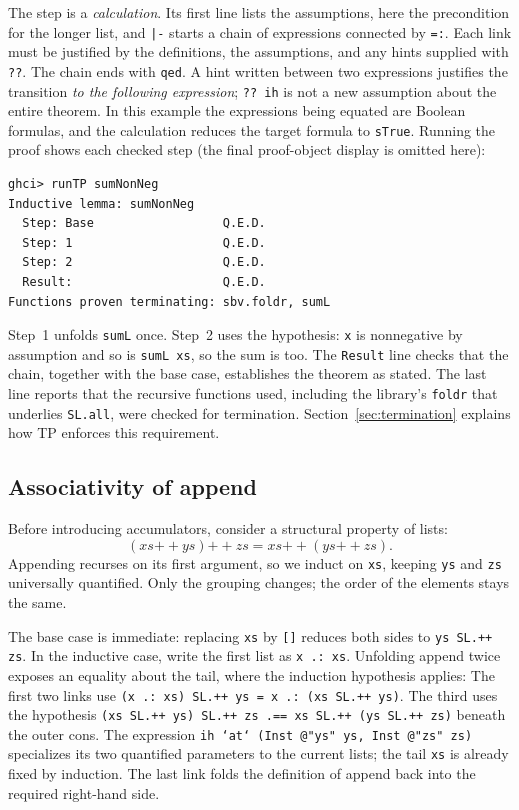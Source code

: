 \documentclass[review]{jfp-epi}
\newcommand{\code}[1]{\texttt{#1}}
\begin{document}
The step is a \emph{calculation}. Its first line lists the assumptions, here the
precondition for the longer list, and \code{|-} starts a chain of expressions
connected by \code{=:}. Each link must be justified by the definitions, the
assumptions, and any hints supplied with \code{??}. The chain ends with
\code{qed}. A hint written between two expressions justifies the transition
\emph{to the following expression}; \code{?? ih} is not a new assumption about
the entire theorem. In this example the expressions being equated are Boolean
formulas, and the calculation reduces the target formula to \code{sTrue}.
Running the proof shows each checked step (the final proof-object display is
omitted here):
\begin{lstlisting}[style=output]
ghci> runTP sumNonNeg
Inductive lemma: sumNonNeg
  Step: Base                  Q.E.D.
  Step: 1                     Q.E.D.
  Step: 2                     Q.E.D.
  Result:                     Q.E.D.
Functions proven terminating: sbv.foldr, sumL
\end{lstlisting}
Step~1 unfolds \code{sumL} once. Step~2 uses the hypothesis: \code{x} is
nonnegative by assumption and so is \code{sumL xs}, so the sum is too. The
\code{Result} line checks that the chain, together with the base case, establishes
the theorem as stated. The last line reports that the recursive functions used,
including the library's \code{foldr} that underlies \code{SL.all}, were checked for
termination. Section~\ref{sec:termination} explains how TP enforces this requirement.

\subsection{Associativity of append}
\label{sec:append-assoc}

Before introducing accumulators, consider a structural property of lists:
\[
  (xs \mathbin{++} ys) \mathbin{++} zs
  = xs \mathbin{++} (ys \mathbin{++} zs).
\]
Appending recurses on its first argument, so we induct on \code{xs}, keeping
\code{ys} and \code{zs} universally quantified. Only the grouping changes;
the order of the elements stays the same.

The base case is immediate: replacing \code{xs} by \code{[]} reduces both
sides to \code{ys SL.++ zs}. In the inductive case, write the first list as
\code{x .: xs}. Unfolding append twice exposes an equality about the tail,
where the induction hypothesis applies:
The first two links use \code{(x .: xs) SL.++ ys = x .: (xs SL.++ ys)}.
The third uses the hypothesis
\code{(xs SL.++ ys) SL.++ zs .== xs SL.++ (ys SL.++ zs)} beneath the
outer cons. The expression \code{ih `at` (Inst @"ys" ys, Inst @"zs" zs)}
specializes its two quantified parameters to the current lists; the tail
\code{xs} is already fixed by induction. The last link folds the definition
of append back into the required right-hand side.
\end{document}
